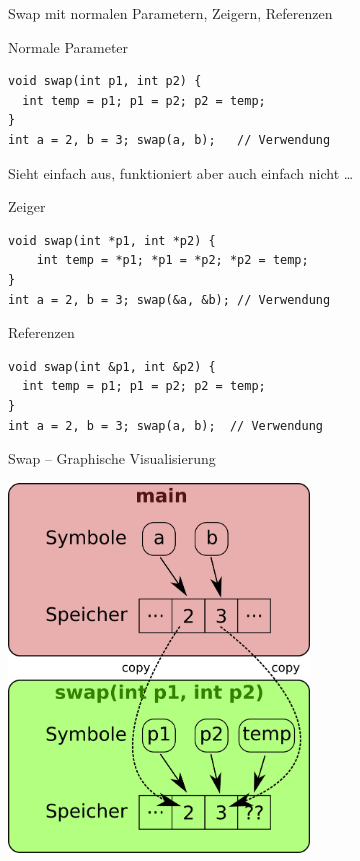 \documentclass[presentation]{beamer}
\begin{document}
\begin{frame}[fragile,label={sec:orga7944fa}]{Swap mit normalen Parametern, Zeigern, Referenzen}
 \begin{block}{Normale Parameter}
\begin{verbatim}
void swap(int p1, int p2) {
  int temp = p1; p1 = p2; p2 = temp;
}
int a = 2, b = 3; swap(a, b);   // Verwendung
\end{verbatim}
\footnotesize
Sieht einfach aus, funktioniert aber auch einfach nicht \ldots{}
\end{block}
\begin{block}{Zeiger}
\begin{verbatim}
void swap(int *p1, int *p2) {
    int temp = *p1; *p1 = *p2; *p2 = temp;
}
int a = 2, b = 3; swap(&a, &b); // Verwendung
\end{verbatim}
\end{block}
\begin{block}{Referenzen}
\begin{verbatim}
void swap(int &p1, int &p2) {
  int temp = p1; p1 = p2; p2 = temp;
}
int a = 2, b = 3; swap(a, b);  // Verwendung
\end{verbatim}
\end{block}
\end{frame}
\begin{frame}[label={sec:orgfda703d}]{Swap -- Graphische Visualisierung}
\begin{center}\begin{center}
\includegraphics[width=0.6\textwidth]{img/swap_copy.png}
\end{center}\end{center}
\end{frame}
\end{document}
